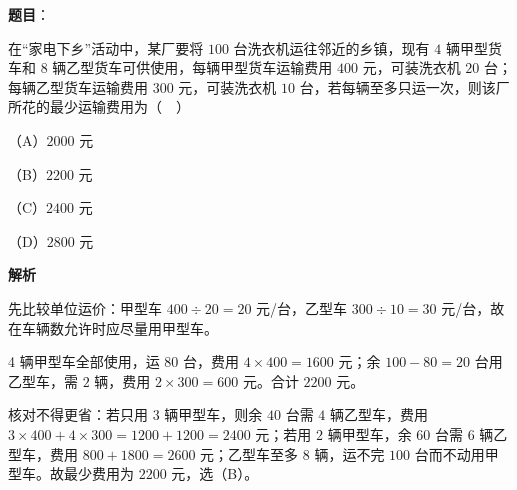 \begin{answer}

\textbf{题目}：

在“家电下乡”活动中，某厂要将 $100$ 台洗衣机运往邻近的乡镇，现有 $4$ 辆甲型货车和 $8$ 辆乙型货车可供使用，每辆甲型货车运输费用 $400$ 元，可装洗衣机 $20$ 台；每辆乙型货车运输费用 $300$ 元，可装洗衣机 $10$ 台，若每辆至多只运一次，则该厂所花的最少运输费用为（　）

（A）$2000$ 元

（B）$2200$ 元

（C）$2400$ 元

（D）$2800$ 元

\textbf{解析}

先比较单位运价：甲型车 $400\div20=20$ 元/台，乙型车 $300\div10=30$ 元/台，故在车辆数允许时应尽量用甲型车。

4 辆甲型车全部使用，运 $80$ 台，费用 $4\times400=1600$ 元；余 $100-80=20$ 台用乙型车，需 $2$ 辆，费用 $2\times300=600$ 元。合计 $2200$ 元。

核对不得更省：若只用 $3$ 辆甲型车，则余 $40$ 台需 $4$ 辆乙型车，费用 $3\times400+4\times300=1200+1200=2400$ 元；若用 $2$ 辆甲型车，余 $60$ 台需 $6$ 辆乙型车，费用 $800+1800=2600$ 元；乙型车至多 $8$ 辆，运不完 $100$ 台而不动用甲型车。故最少费用为 $2200$ 元，选（B）。


\end{answer}
